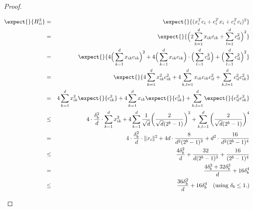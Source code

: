 \begin{proof}
\begin{enumerate}
\begin{eqnarray*}
	\expect{}{H_{ii}^2} &=& \expect{}{(x_i^T c_i + c_i^T x_i + c_i^T c_i)^2} \\
	&=& \expect{}{\Big(2 \sum_{k=1}^d x_{ik} c_{ik}  + \sum_{l=1}^d c_{il}^2 \Big)^2} \\
	&=& \expect{}{4 \Big(\sum_{k=1}^d x_{ik} c_{ik}\Big)^2  + 4 \Big(\sum_{k=1}^d x_{ik} c_{ik}\Big)\cdot \Big(\sum_{l=1}^d c_{il}^2 \Big) + \Big(\sum_{l=1}^d c_{il}^2 \Big)^2} \\
	&=& \expect{}{4 \sum_{k=1}^d x_{ik}^2 c_{ik}^2  + 4 \sum_{k,l=1}^d x_{ik} c_{ik} c_{il}^2  + \sum_{k,l=1}^d c_{il}^2 c_{ik}^2 } \\
	&=& 4 \sum_{k=1}^d x_{ik}^2 \expect{}{c_{ik}^2}  + 4 \sum_{k=1}^d x_{ik} \expect{}{c_{ik}^3}  + \sum_{k,l=1}^d \expect{}{c_{il}^2 c_{ik}^2} \\
	&\leq& 4\cdot \frac{\delta_b^2}{d}\cdot \sum_{k=1}^d x_{ik}^2  + 4 \sum_{k=1}^d \frac{1}{\sqrt{d}} \bigg(\frac{2}{\sqrt{d}(2^b-1)}\bigg)^3  + \sum_{k,l=1}^d \bigg(\frac{2}{\sqrt{d}(2^b-1)}\bigg)^4 \\
	&=& 4\cdot \frac{\delta_b^2}{d}\cdot \|x_i\|^2  + 4 d\cdot \frac{8}{d^2(2^b-1)^3}  + d^2 \cdot \frac{16}{d^2(2^b-1)^4} \\
	&\leq&  \frac{4\delta_b^2}{d}  + \frac{32}{d(2^b-1)^3}  + \frac{16}{(2^b-1)^4} \\
	&=& \frac{4\delta_b^2 + 32\delta_b^3}{d} + 16 \delta_b^4 \\
	&\leq& \frac{36\delta_b^2}{d} + 16 \delta_b^4  \quad \text{(using $\delta_b \leq 1$.)} \\

\end{eqnarray*}
\end{enumerate}
\end{proof}

